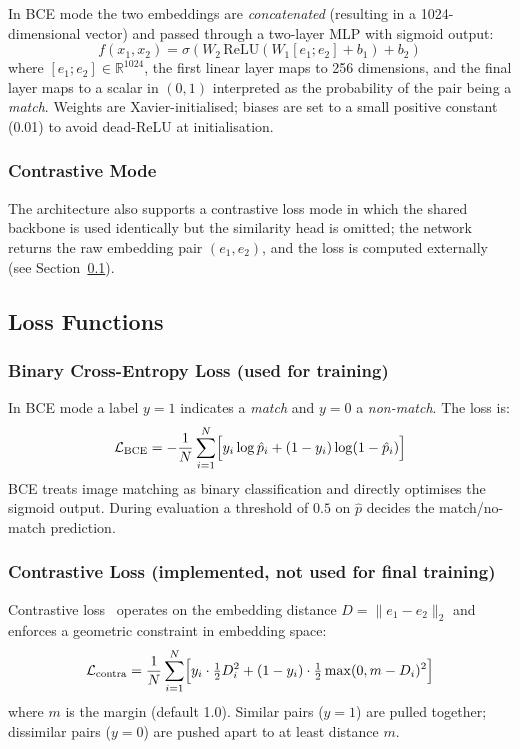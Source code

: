 \documentclass[11pt,letterpaper]{article}
\begin{document}
In BCE mode the two embeddings are \emph{concatenated} (resulting in a 1024-dimensional vector) and passed through a two-layer MLP with sigmoid output:
\[
f(x_1, x_2) = \sigma\!\left(W_2 \, \mathrm{ReLU}(W_1 [e_1; e_2] + b_1) + b_2\right)
\]
where $[e_1; e_2] \in \mathbb{R}^{1024}$, the first linear layer maps to 256 dimensions, and the final layer maps to a scalar in $(0, 1)$ interpreted as the probability of the pair being a \emph{match}. Weights are Xavier-initialised; biases are set to a small positive constant (0.01) to avoid dead-ReLU at initialisation.

\subsubsection{Contrastive Mode}

The architecture also supports a contrastive loss mode in which the shared backbone is used identically but the similarity head is omitted; the network returns the raw embedding pair $(e_1, e_2)$, and the loss is computed externally (see Section~\ref{sec:loss}).

\subsection{Loss Functions}
\label{sec:loss}

\subsubsection{Binary Cross-Entropy Loss (used for training)}

In BCE mode a label $y=1$ indicates a \emph{match} and $y=0$ a \emph{non-match}. The loss is:
\[
\mathcal{L}_\text{BCE} = -\frac{1}{N}\sum_{i=1}^N \Bigl[ y_i \log \hat{p}_i + (1-y_i)\log(1-\hat{p}_i) \Bigr]
\]
BCE treats image matching as binary classification and directly optimises the sigmoid output. During evaluation a threshold of $0.5$ on $\hat{p}$ decides the match/no-match prediction.

\subsubsection{Contrastive Loss (implemented, not used for final training)}

Contrastive loss~\cite{hadsell2006} operates on the embedding distance $D = \|e_1 - e_2\|_2$ and enforces a geometric constraint in embedding space:
\[
\mathcal{L}_\text{contra} = \frac{1}{N}\sum_{i=1}^N \Bigl[
  y_i \cdot \tfrac{1}{2} D_i^2
  + (1-y_i) \cdot \tfrac{1}{2} \max(0, m - D_i)^2
\Bigr]
\]
where $m$ is the margin (default 1.0). Similar pairs ($y=1$) are pulled together; dissimilar pairs ($y=0$) are pushed apart to at least distance $m$.
\end{document}
